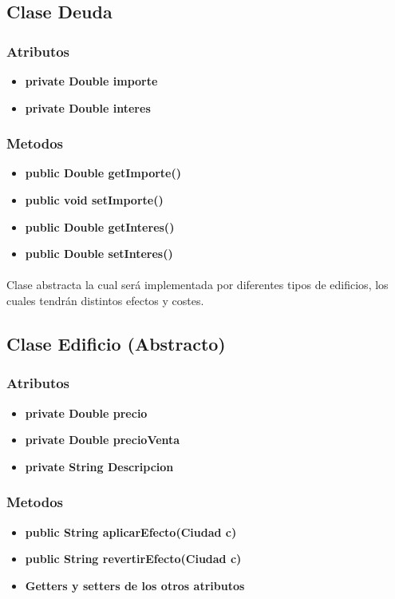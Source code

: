 \documentclass[12pt,a4paper]{article}
\begin{document}
    \subsection{Clase Deuda}
        \subsubsection{Atributos}
        \begin{itemize}
            \item \textbf{private Double importe}
            \item \textbf{private Double interes}
        \end{itemize}
        \subsubsection{Metodos}
        \begin{itemize}
            \item \textbf{public Double getImporte()}
            \item \textbf{public void setImporte()}
            \item \textbf{public Double getInteres()}
            \item \textbf{public Double setInteres()} 
        \end{itemize}
    \paragraph{}
    Clase abstracta la cual será implementada por diferentes tipos de edificios, los cuales tendrán distintos efectos y costes.
    \subsection{Clase Edificio (Abstracto)}
        \subsubsection{Atributos}
        \begin{itemize}
            \item \textbf{private Double precio}
            \item \textbf{private Double precioVenta} 
            \item \textbf{private String Descripcion}
        \end{itemize}
        \subsubsection{Metodos}
        \begin{itemize}
            \item \textbf{public String aplicarEfecto(Ciudad c)}
            \item \textbf{public String revertirEfecto(Ciudad c)}
            \item \textbf{Getters y setters de los otros atributos}
        \end{itemize}
\end{document}

